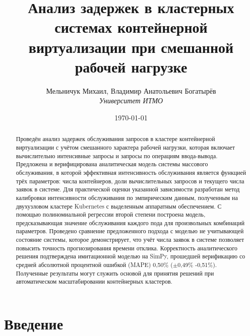 \documentclass[12pt,a4paper]{article}
\title{Анализ задержек в кластерных системах контейнерной виртуализации при смешанной рабочей нагрузке}
\author{
 Мельничук Михаил, Владимир Анатольевич Богатырёв\\ {\itshape\large Университет ИТМО}\\
}
\date{\today}
\begin{document}
\maketitle
\begin{abstract}
  Проведён анализ задержек обслуживания запросов в кластере контейнерной виртуализации с учётом смешанного характера рабочей нагрузки, которая включает вычислительно интенсивные запросы и запросы по операциям ввода-вывода. Предложена и верифицирована аналитическая модель системы массового обслуживания, в которой эффективная интенсивность обслуживания является функцией трёх параметров: числа контейнеров, доли вычислительных запросов и текущего числа заявок в системе. Для практической оценки указанной зависимости разработан метод калибровки интенсивности обслуживания по эмпирическим данным, полученным на двухузловом кластере Kubernetes с выделенным аппаратным обеспечением. С помощью полиномиальной регрессии второй степени построена модель, предсказывающая значение обслуживания каждого пода для произвольных комбинаций параметров. Проведено сравнение предложенного подхода с моделью не учитывающей состояние системы, которое демонстрирует, что учёт числа заявок в системе позволяет повысить точность прогнозирования времени отклика. Корректность аналитического решения подтверждена имитационной моделью на SimPy, прошедшей верификацию со средней абсолютной процентной ошибкой (MAPE) 0,50\% ($\pm$0,49\% -0,51\%). Полученные результаты могут служить основой для принятия решений при автоматическом масштабировании контейнерных кластеров.
\end{abstract}

\section{Введение}
\label{sec:introduction}
\end{document}
